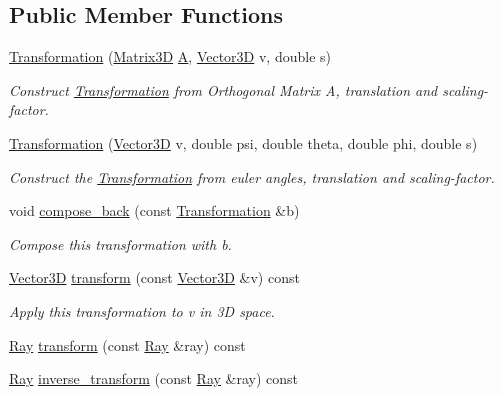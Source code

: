 \subsection*{Public Member Functions}
\begin{DoxyCompactItemize}
\item 
\hyperlink{classlinalg_1_1Transformation_a92fd6d6de1cf518d6316219339e42eff}{Transformation} (\hyperlink{classlinalg_1_1Matrix3D}{Matrix3D} \hyperlink{classlinalg_1_1Transformation_a24a75d79007bc9b5c5f32c042fb4332b}{A}, \hyperlink{classVector3D}{Vector3D} v, double s)
\begin{DoxyCompactList}\small\item\em Construct \hyperlink{classlinalg_1_1Transformation}{Transformation} from Orthogonal Matrix A, translation and scaling-\/factor. \end{DoxyCompactList}\item 
\hyperlink{classlinalg_1_1Transformation_ac6339d874eca2be8ae458a10e43f644e}{Transformation} (\hyperlink{classVector3D}{Vector3D} v, double psi, double theta, double phi, double s)
\begin{DoxyCompactList}\small\item\em Construct the \hyperlink{classlinalg_1_1Transformation}{Transformation} from euler angles, translation and scaling-\/factor. \end{DoxyCompactList}\item 
void \hyperlink{classlinalg_1_1Transformation_aa6e43ea1e47c3929d4903dce85a5dbd5}{compose\+\_\+back} (const \hyperlink{classlinalg_1_1Transformation}{Transformation} \&b)
\begin{DoxyCompactList}\small\item\em Compose this transformation with b. \end{DoxyCompactList}\item 
\hyperlink{classVector3D}{Vector3D} \hyperlink{classlinalg_1_1Transformation_a5b31c95da6547d580236566266c840a6}{transform} (const \hyperlink{classVector3D}{Vector3D} \&v) const 
\begin{DoxyCompactList}\small\item\em Apply this transformation to v in 3D space. \end{DoxyCompactList}\item 
\hyperlink{classRay}{Ray} \hyperlink{classlinalg_1_1Transformation_a4c2d3618ae14a0e8ebe55ae65b43381c}{transform} (const \hyperlink{classRay}{Ray} \&ray) const 
\item 
\hyperlink{classRay}{Ray} \hyperlink{classlinalg_1_1Transformation_a831147736700a461eb0e7a388649430d}{inverse\+\_\+transform} (const \hyperlink{classRay}{Ray} \&ray) const 

\end{DoxyCompactItemize}

